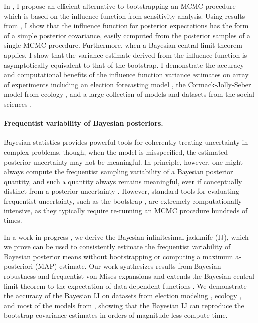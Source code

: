 In \citep{giordano:2020:bayesij, giordano:2020:stanconbayesij}, I propose an
efficient alternative to bootstrapping an MCMC procedure which is based on the
influence function from sensitivity analysis.  Using results from
\citep{giordano:2018:covariances, giordano:2019:ij}, I show that the influence
function for posterior expectations has the form of a simple posterior
covariance, easily computed from the posterior samples of a single MCMC
procedure. Furthermore, when a Bayesian central limit theorem applies, I show
that the variance estimate derived from the influence function is asymptotically
equivalent to that of the bootstrap.  I demonstrate the accuracy and
computational benefits of the influence function variance estimates on array of
experiments including an election forecasting model
\citep{economist:2020:election}, the Cormack-Jolly-Seber model from ecology
\citep{kery:2011:bayesian}, and a large collection of models and datasets from
the social sciences \citep{gelman:2006:arm}.



\newpage


\paragraph{Frequentist variability of Bayesian posteriors.}

Bayesian statistics provides powerful tools for coherently treating uncertainty
in complex problems, though, when the model is misspecified, the estimated
posterior uncertainty may not be meaningful.  In principle, however, one might
always compute the frequentist sampling variability of a Bayesian posterior
quantity, and such a quantity always remains meaningful, even if conceptually
distinct from a posterior uncertainty \citep{waddell:2002:bayesphyloboot,
kleijn:2006:misspecification}.  However, standard tools for evaluating
frequentist uncertainty, such as the bootstrap \citep{huggins:2019:bayesbag},
are extremely computationally intensive, as they typically require re-running an
MCMC procedure hundreds of times.

In a work in progress \citep{giordano:2020:bayesij}, we derive the Bayesian
infinitesimal jackknife (IJ), which we prove can be used to consistently
estimate the frequentist variability of Bayesian posterior means without
bootstrapping or computing a maximum a-posteriori (MAP) estimate.  Our work
synthesizes results from Bayesian robustness and frequentist von Mises
expansions and extends the Bayesian central limit theorem to the expectation of
data-dependent functions
\citep{jaeckel:1972:infinitesimal,shao:2012:jackknife,giordano:2019:ij,gustafson:2012:localrobustnessbook,giordano:2018:covariances,
lehman:1983:pointestimation, kass:1990:posteriorexpansions}. We demonstrate the
accuracy of the Bayesian IJ on datasets from election modeling
\citep{economist:2020:election}, ecology \citep{kery:2011:bayesian}, and most of
the models from \citep{gelman:2006:arm, stan-examples:2017}, showing that the
Bayesian IJ can reproduce the bootstrap covariance estimates in orders of
magnitude less compute time.



